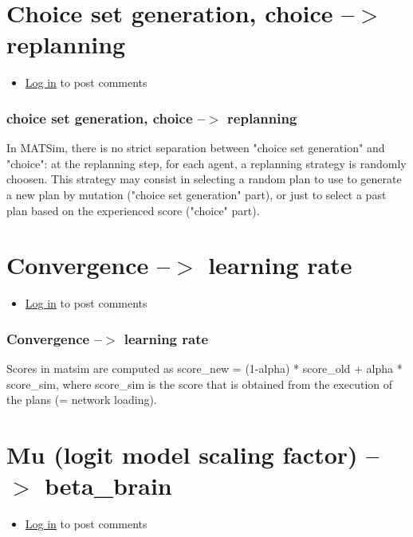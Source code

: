 \documentclass[a4paper,11pt]{report}
\begin{document}
\vfill\eject
\section{Choice set generation, choice --$>$ replanning}
\begin{itemize}
	\item \href{http://www.matsim.org/user/login?destination=comment/reply/546%23comment-form}{Log in} to post comments
\end{itemize}

\subsubsection{choice set generation, choice --$>$ replanning}

In MATSim, there is no strict separation between "choice set  generation" and "choice": at the replanning step, for each agent, a  replanning strategy is randomly choosen. This strategy may consist in  selecting a random plan to use to generate a new plan by mutation  ("choice set generation" part), or just to select a past plan based on  the experienced score ("choice" part).

\vfill\eject
\section{Convergence --$>$ learning rate}
\begin{itemize}
	\item \href{http://www.matsim.org/user/login?destination=comment/reply/547%23comment-form}{Log in} to post comments
\end{itemize}

\subsubsection{Convergence --$>$ learning rate}

Scores in matsim are computed as score\_new = (1-alpha) * score\_old +   alpha * score\_sim, where score\_sim is the score that is obtained from   the execution of the plans (= network loading).

\vfill\eject
\section{Mu (logit model scaling factor) --$>$ beta\_brain}
\begin{itemize}
	\item \href{http://www.matsim.org/user/login?destination=comment/reply/545%23comment-form}{Log in} to post comments
\end{itemize}
\end{document}
